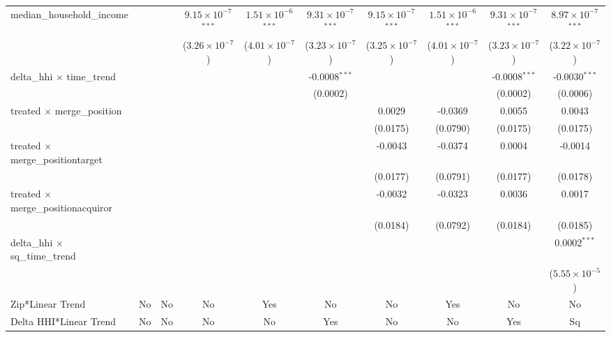 \begin{table}[H]
{\begin{tabular}{lccccccccc}
 median\_household\_income&   &    & $9.15\times 10^{-7}$$^{***}$ & $1.51\times 10^{-6}$$^{***}$ & $9.31\times 10^{-7}$$^{***}$ & $9.15\times 10^{-7}$$^{***}$ & $1.51\times 10^{-6}$$^{***}$ & $9.31\times 10^{-7}$$^{***}$ & $8.97\times 10^{-7}$$^{***}$\\ 

   &   &    & ($3.26\times 10^{-7}$) & ($4.01\times 10^{-7}$) & ($3.23\times 10^{-7}$) & ($3.25\times 10^{-7}$) & ($4.01\times 10^{-7}$) & ($3.23\times 10^{-7}$) & ($3.22\times 10^{-7}$)\\ 

 delta\_hhi $\times $ time\_trend&   &    &    &    & -0.0008$^{***}$ &    &    & -0.0008$^{***}$ & -0.0030$^{***}$\\ 

   &   &    &    &    & (0.0002) &    &    & (0.0002) & (0.0006)\\ 

 treated $\times $ merge\_position&   &    &    &    &    & 0.0029 & -0.0369 & 0.0055 & 0.0043\\ 

   &   &    &    &    &    & (0.0175) & (0.0790) & (0.0175) & (0.0175)\\ 

 treated $\times $ merge\_positiontarget&   &    &    &    &    & -0.0043 & -0.0374 & 0.0004 & -0.0014\\ 

   &   &    &    &    &    & (0.0177) & (0.0791) & (0.0177) & (0.0178)\\ 

 treated $\times $ merge\_positionacquiror&   &    &    &    &    & -0.0032 & -0.0323 & 0.0036 & 0.0017\\ 

   &   &    &    &    &    & (0.0184) & (0.0792) & (0.0184) & (0.0185)\\ 

 delta\_hhi $\times $ sq\_time\_trend&   &    &    &    &    &    &    &    & 0.0002$^{***}$\\ 

   &   &    &    &    &    &    &    &    & ($5.55\times 10^{-5}$)\\ 

 Zip*Linear Trend & No & No & No & Yes & No & No & Yes & No & No\\ 

 Delta HHI*Linear Trend & No & No & No & No & Yes & No & No & Yes & Sq\\ 


\end{tabular}}
\end{table}
